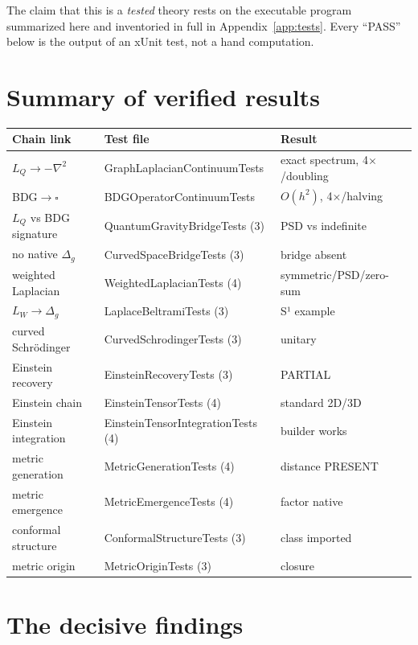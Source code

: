 \documentclass[10pt,twoside,openany]{book}
\begin{document}
The claim that this is a \emph{tested} theory rests on the executable program summarized
here and inventoried in full in Appendix~\ref{app:tests}. Every ``PASS'' below is the
output of an xUnit test, not a hand computation.

\section{Summary of verified results}

\begin{center}
\begin{tabular}{lll}
\toprule
Chain link & Test file & Result \\
\midrule
$L_Q\to-\nabla^2$ & GraphLaplacianContinuumTests & exact spectrum, 4$\times$/doubling \\
BDG$\to\square$ & BDGOperatorContinuumTests & $O(h^2)$, 4$\times$/halving \\
$L_Q$ vs BDG signature & QuantumGravityBridgeTests (3) & PSD vs indefinite \\
no native $\Delta_g$ & CurvedSpaceBridgeTests (3) & bridge absent \\
weighted Laplacian & WeightedLaplacianTests (4) & symmetric/PSD/zero-sum \\
$L_W\to\Delta_g$ & LaplaceBeltramiTests (3) & S¹ example \\
curved Schr\"odinger & CurvedSchrodingerTests (3) & unitary \\
Einstein recovery & EinsteinRecoveryTests (3) & PARTIAL \\
Einstein chain & EinsteinTensorTests (4) & standard 2D/3D \\
Einstein integration & EinsteinTensorIntegrationTests (4) & builder works \\
metric generation & MetricGenerationTests (4) & distance PRESENT \\
metric emergence & MetricEmergenceTests (4) & factor native \\
conformal structure & ConformalStructureTests (3) & class imported \\
metric origin & MetricOriginTests (3) & closure \\
\bottomrule
\end{tabular}
\end{center}

\section{The decisive findings}
\end{document}
